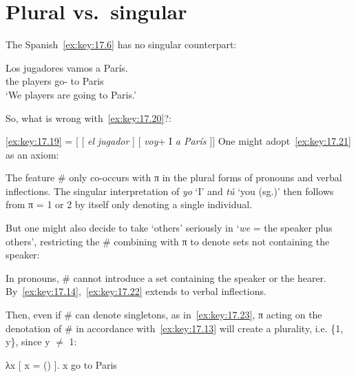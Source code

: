 \documentclass[output=paper]{langsci/langscibook}
\begin{document}
\section{Plural vs.\ singular}\label{sec:key:17.4}

The Spanish~\eqref{ex:key:17.6} has no singular counterpart:

\begin{exe}
\exi{\eqref{ex:key:17.6}}
    \gll    Los jugadores vamos a París.\\
            the players      go-\Fpl{} to Paris\\
    \glt    ‘We players are going to Paris.’
\end{exe}

\label{ex:key:17.19}
\z
So, what is wrong with~\eqref{ex:key:17.20}?:

\ea\label{ex:key:17.20}
    \eqref{ex:key:17.19} = [ [ \emph{el}\tss{\#} \emph{jugador} ] [ \emph{voy}+ I\tss{\#} \emph{a París} ]]
\z
One might adopt~\eqref{ex:key:17.21} as an axiom:

\ea\label{ex:key:17.21}
    The feature \# only co-occurs with π in the plural forms of pronouns
    and verbal inflections.
\z
The singular interpretation of \emph{yo} ‘I’ and \emph{tú} ‘you (sg.)’ then
follows from π = 1 or 2 by itself only denoting a single individual.

But one might also decide to take ‘others’ seriously in ‘\emph{we} = the
speaker plus others’, restricting the \# combining with π to denote sets not
containing the speaker:

\ea\label{ex:key:17.22}
    In pronouns, \# cannot introduce a set containing the speaker or the hearer.
\z
By~\eqref{ex:key:17.14},~\eqref{ex:key:17.22} extends to verbal inflections.

Then, even if \# can denote singletons, as in~\eqref{ex:key:17.23}, π acting on
the denotation of \# in accordance with~\eqref{ex:key:17.13} will create a
plurality, i.e. \{1, y\}, since y ${\neq}$ 1:

\ea\label{ex:key:17.23}
    λx [ x = () ]. x go to Paris\\
\z
\end{document}
